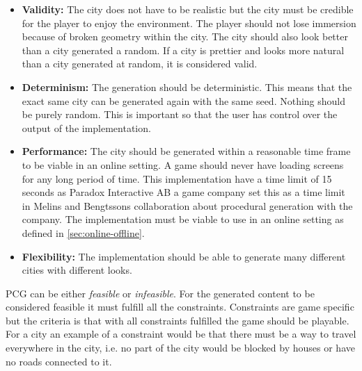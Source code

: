 \begin{itemize}
	\item \textbf{Validity:} The city does not have to be realistic but the city must be credible for the player to enjoy the environment. The player should not lose immersion because of broken geometry within the city. The city should also look better than a city generated a random. If a city is prettier and looks more natural than a city generated at random, it is considered valid.
		
	\item \textbf{Determinism:} The generation should be deterministic. This means that the exact same city can be generated again with the same seed. Nothing should be purely random. This is important so that the user has control over the output of the implementation.
		
	\item \textbf{Performance:} The city should be generated within a reasonable time frame to be viable in an online setting. A game should never have loading screens for any long period of time. This implementation have a time limit of 15 seconds as Paradox Interactive AB a game company set this as a time limit in Melins and Bengtssons collaboration about procedural generation with the company\cite{FloorPlanPCG}. The implementation must be viable to use in an online setting as defined in \ref{sec:online-offline}.
		
	\item \textbf{Flexibility: } The implementation should be able to generate many different cities with different looks.
\end{itemize} 

PCG can be either \textit{feasible} or \textit{infeasible}. For the generated content to be considered feasible it must fulfill all the constraints\cite{NoveltySearch}. Constraints are game specific but the criteria is that with all constraints fulfilled the game should be playable. For a city an example of a constraint would be that there must be a way to travel everywhere in the city, i.e. no part of the city would be blocked by houses or have no roads connected to it.